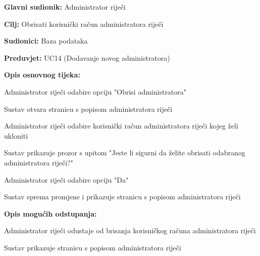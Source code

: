 				\noindent {}
				\begin{packed_item}
					
					\item \textbf{Glavni sudionik: }Administrator riječi
					\item  \textbf{Cilj:} Obrisati korisnički račun administratora riječi
					\item  \textbf{Sudionici:} Baza podataka
					\item  \textbf{Preduvjet:} UC14 (Dodavanje novog administratora)
					\item  \textbf{Opis osnovnog tijeka:}
					
					\item[] \begin{packed_enum}
						
						\item Administrator riječi odabire opciju "Obrisi administratora"
						\item Sustav otvara stranicu s popisom administratora riječi
						\item Administrator riječi odabire korisnički račun administratora riječi kojeg želi ukloniti
						\item Sustav prikazuje prozor s upitom "Jeste li sigurni da želite obrisati odabranog administratora riječi?"
						\item Administrator riječi odabire opciju "Da"
						\item Sustav sprema promjene i prikazuje stranicu s popisom administratora riječi
						
					\end{packed_enum}
					
					\item  \textbf{Opis mogućih odstupanja:}
					
					\item[] \begin{packed_item}
						
						\item[4.a] Administrator riječi odustaje od brisanja korisničkog računa administratora riječi
						\item[] \begin{packed_enum}
							
							\item Sustav prikazuje stranicu s popisom administratora riječi
							
						\end{packed_enum}
						
						
					\end{packed_item}
				\end{packed_item}
				

